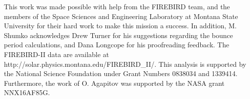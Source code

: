 \documentclass[draft, linenumbers]{agujournal}
\begin{document}
%




%
%
%
%
%
%
%


\acknowledgments
This work was made possible with help from the FIREBIRD team, and the members of the Space Sciences and Engineering Laboratory at Montana State University for their hard work to make this mission a success. In addition, M. Shumko acknowledges Drew Turner for his suggestions regarding the bounce period calculations, and Dana Longcope for his proofreading feedback. The FIREBIRD-II data are available at http://solar.physics.montana.edu/FIREBIRD\_II/. This analysis is supported by the National Science Foundation under Grant Numbers 0838034 and 1339414. Furthermore, the work of O. Agapitov was supported by the NASA grant NNX16AF85G.
\end{document}
